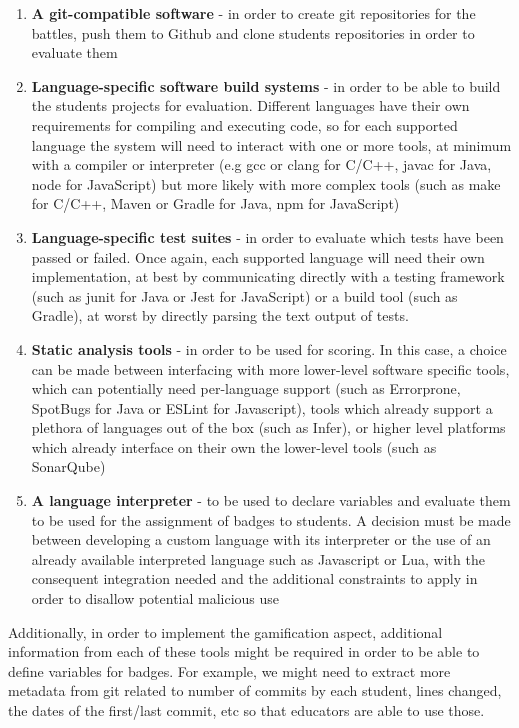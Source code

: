 \begin{enumerate}
      \item \textbf{A git-compatible software} {-} in order to create git repositories for
            the battles, push them to Github and clone students repositories in order to evaluate
            them
      \item \textbf{Language-specific software build systems} {-} in order to be able to build
            the students projects for evaluation. Different languages have their own
            requirements for compiling and executing code, so for each supported language
            the system will need to interact with one or more tools, at minimum with a
            compiler or interpreter (e.g gcc or clang for C/C++, javac for Java, node for
            JavaScript) but more likely with more complex tools (such as make for C/C++,
            Maven or Gradle for Java, npm for JavaScript)
      \item \textbf{Language-specific test suites} {-} in order to evaluate which
            tests have been passed or failed. Once again, each supported language
            will need their own implementation, at best by communicating directly
            with a testing framework (such as junit for Java or Jest for JavaScript)
            or a build tool (such as Gradle), at worst by directly parsing the text
            output of tests.
      \item \textbf{Static analysis tools} {-} in order to be used for scoring. In this
            case, a choice can be made between interfacing with more lower-level software
            specific tools, which can potentially need per-language support (such as
            Errorprone, SpotBugs for Java or ESLint for Javascript), tools which already
            support a plethora of languages out of the box (such as Infer), or higher level
            platforms which already interface on their own the lower-level tools (such as
            SonarQube)
      \item \textbf{A language interpreter} {-} to be used to declare variables and evaluate
            them to be used for the assignment of badges to students. A decision must be made
            between developing a custom language with its interpreter or the use of an already
            available interpreted language such as Javascript or Lua, with the consequent
            integration needed and the additional constraints to apply in order to disallow
            potential malicious use
\end{enumerate}
Additionally, in order to implement the gamification aspect, additional information
from each of these tools might be required in order to be able to define variables
for badges. For example, we might need to extract more metadata from git
related to number of commits by each student, lines changed, the dates of
the first/last commit, etc so that educators are able to use those.

